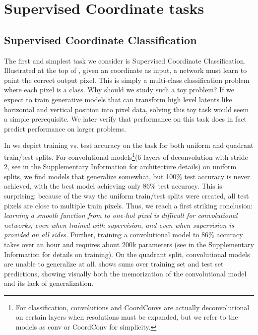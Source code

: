 \documentclass{article}
\begin{document}
\vspace*{-.5em}
\section{Supervised Coordinate tasks}
\vspace*{-.6em}

\subsection{Supervised Coordinate Classification}
\vspace*{-.6em}

The first and simplest task we consider is Supervised Coordinate Classification.
Illustrated at the top of , given an  coordinate as input, a network must learn to paint the correct output pixel. This is simply a multi-class classification problem where each pixel is a class.
Why should we study such a toy problem? If we expect to train generative models that can transform high level latents like horizontal and vertical position into pixel data, solving this toy task would seem a simple prerequisite. We later verify that performance on this task does in fact predict performance on larger problems.

In  we depict training vs. test accuracy on the task for both uniform and quadrant train/test splits.
For convolutional models\footnote{For classification, convolutions and CoordConvs are actually deconvolutional on certain layers when resolutions must be expanded, but we refer to the models as conv or CoordConv for simplicity.}(6 layers of deconvolution with stride 2, see   in the Supplementary Information for architecture details) on uniform splits, we find models that generalize somewhat, but 100\% test accuracy is never achieved, with the best model achieving only 86\% test accuracy. This is surprising: because of the way the uniform train/test splits were created, all test pixels are close to multiple train pixels.
Thus, we reach a first striking conclusion: \emph{learning a smooth function from  to one-hot pixel is difficult for convolutional networks, even when trained with supervision, and even when supervision is provided on all sides.}
Further, training a convolutional model to 86\% accuracy takes over an hour and requires about 200k parameters (see  in the Supplementary Information for details on training).
On the quadrant split, convolutional models are unable to generalize at all.  shows sums over training set and test set predictions, showing visually both the memorization of the convolutional model and its lack of generalization.
\end{document}
